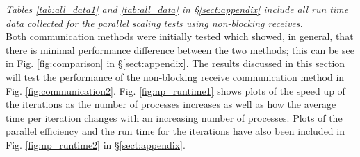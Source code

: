 \documentclass[11pt, a4paper]{article}
\begin{document}
			\textit{Tables \ref{tab:all_data1} and \ref{tab:all_data} in \S\ref{sect:appendix} include all run time data collected for the parallel scaling tests using non-blocking receives.}\\
			
			\noindent Both communication methods were initially tested which showed, in general, that there is minimal performance difference between the two methods; this can be see in Fig. \ref{fig:comparison} in \S\ref{sect:appendix}. The results discussed in this section will test the performance of the non-blocking receive communication method in Fig. \ref{fig:communication2}. Fig. \ref{fig:np_runtime1} shows plots of the speed up of the iterations as the number of processes increases as well as how the average time per iteration changes with an increasing number of processes. Plots of the parallel efficiency and the run time for the iterations have also been included in Fig. \ref{fig:np_runtime2} in \S\ref{sect:appendix}.
			
\end{document}
